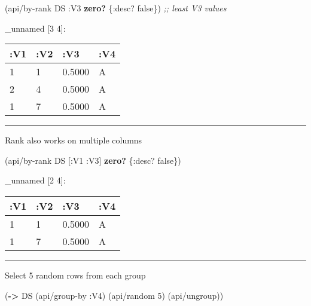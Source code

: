 \documentclass[]{article}
\newenvironment{Shaded}{\begin{snugshade}}{\end{snugshade}}
\newcommand{\KeywordTok}[1]{\textcolor[rgb]{0.13,0.29,0.53}{\textbf{#1}}}
\newcommand{\DecValTok}[1]{\textcolor[rgb]{0.00,0.00,0.81}{#1}}
\newcommand{\CommentTok}[1]{\textcolor[rgb]{0.56,0.35,0.01}{\textit{#1}}}
\newcommand{\VariableTok}[1]{\textcolor[rgb]{0.00,0.00,0.00}{#1}}
\newcommand{\AttributeTok}[1]{\textcolor[rgb]{0.77,0.63,0.00}{#1}}
\newcommand{\NormalTok}[1]{#1}
\begin{document}
\begin{Shaded}
\begin{Highlighting}[]
\NormalTok{(api/by-rank DS }\AttributeTok{:V3} \KeywordTok{zero?}\NormalTok{ \{}\AttributeTok{:desc}\NormalTok{? }\VariableTok{false}\NormalTok{\}) }\CommentTok{;; least V3 values}
\end{Highlighting}
\end{Shaded}

\_unnamed {[}3 4{]}:

\begin{longtable}[]{@{}llll@{}}
\toprule
:V1 & :V2 & :V3 & :V4\tabularnewline
\midrule
\endhead
1 & 1 & 0.5000 & A\tabularnewline
2 & 4 & 0.5000 & A\tabularnewline
1 & 7 & 0.5000 & A\tabularnewline
\bottomrule
\end{longtable}

\begin{center}\rule{0.5\linewidth}{0.5pt}\end{center}

Rank also works on multiple columns

\begin{Shaded}
\begin{Highlighting}[]
\NormalTok{(api/by-rank DS [}\AttributeTok{:V1} \AttributeTok{:V3}\NormalTok{] }\KeywordTok{zero?}\NormalTok{ \{}\AttributeTok{:desc}\NormalTok{? }\VariableTok{false}\NormalTok{\})}
\end{Highlighting}
\end{Shaded}

\_unnamed {[}2 4{]}:

\begin{longtable}[]{@{}llll@{}}
\toprule
:V1 & :V2 & :V3 & :V4\tabularnewline
\midrule
\endhead
1 & 1 & 0.5000 & A\tabularnewline
1 & 7 & 0.5000 & A\tabularnewline
\bottomrule
\end{longtable}

\begin{center}\rule{0.5\linewidth}{0.5pt}\end{center}

Select 5 random rows from each group

\begin{Shaded}
\begin{Highlighting}[]
\NormalTok{(}\KeywordTok{->}\NormalTok{ DS}
\NormalTok{    (api/group-by }\AttributeTok{:V4}\NormalTok{)}
\NormalTok{    (api/random }\DecValTok{5}\NormalTok{)}
\NormalTok{    (api/ungroup))}
\end{Highlighting}
\end{Shaded}
\end{document}
